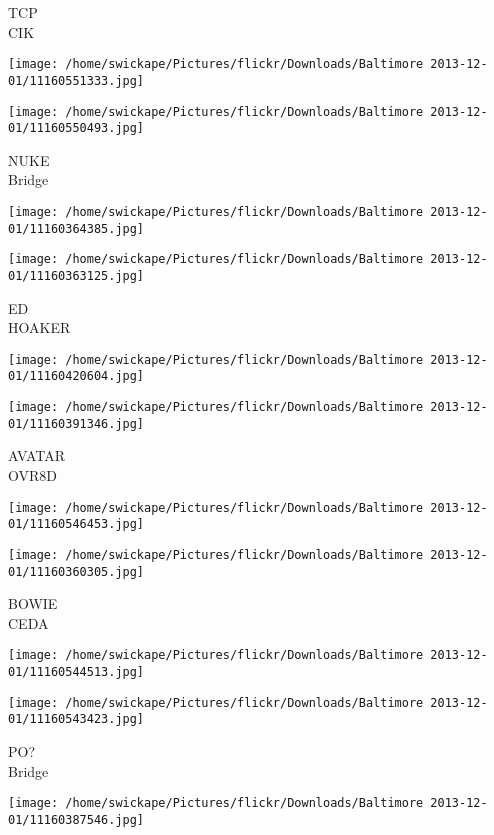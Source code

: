 \documentclass[10pt,letterpaper]{article}
\begin{document}
TCP\\
CIK
\pagebreak

\texttt{[image: /home/swickape/Pictures/flickr/Downloads/Baltimore 2013-12-01/11160551333.jpg]}

\vspace{0.25in}
\texttt{[image: /home/swickape/Pictures/flickr/Downloads/Baltimore 2013-12-01/11160550493.jpg]}

NUKE\\
Bridge
\pagebreak

\texttt{[image: /home/swickape/Pictures/flickr/Downloads/Baltimore 2013-12-01/11160364385.jpg]}

\vspace{0.25in}
\texttt{[image: /home/swickape/Pictures/flickr/Downloads/Baltimore 2013-12-01/11160363125.jpg]}

ED\\
HOAKER
\pagebreak

\texttt{[image: /home/swickape/Pictures/flickr/Downloads/Baltimore 2013-12-01/11160420604.jpg]}

\vspace{0.25in}
\texttt{[image: /home/swickape/Pictures/flickr/Downloads/Baltimore 2013-12-01/11160391346.jpg]}

AVATAR\\
OVR8D
\pagebreak

\texttt{[image: /home/swickape/Pictures/flickr/Downloads/Baltimore 2013-12-01/11160546453.jpg]}

\vspace{0.25in}
\texttt{[image: /home/swickape/Pictures/flickr/Downloads/Baltimore 2013-12-01/11160360305.jpg]}

BOWIE\\
CEDA
\pagebreak

\texttt{[image: /home/swickape/Pictures/flickr/Downloads/Baltimore 2013-12-01/11160544513.jpg]}

\vspace{0.25in}
\texttt{[image: /home/swickape/Pictures/flickr/Downloads/Baltimore 2013-12-01/11160543423.jpg]}

PO?\\
Bridge
\pagebreak

\texttt{[image: /home/swickape/Pictures/flickr/Downloads/Baltimore 2013-12-01/11160387546.jpg]}
\end{document}
